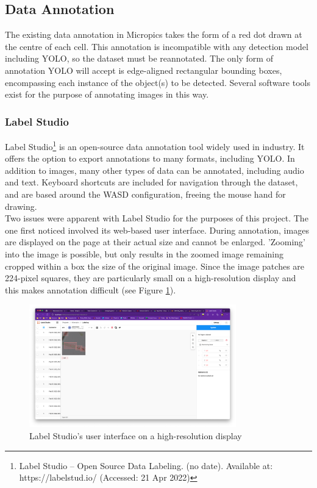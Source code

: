 \subsection{Data Annotation}
The existing data annotation in Micropics takes the form of a red dot drawn at the centre of each cell. This annotation is incompatible with any detection model including YOLO, so the dataset must be reannotated. The only form of annotation YOLO will accept is edge-aligned rectangular bounding boxes, encompassing each instance of the object(s) to be detected. Several software tools exist for the purpose of annotating images in this way.

\subsubsection{Label Studio}
Label Studio\footnote{Label Studio – Open Source Data Labeling. (no date). Available at: https://labelstud.io/ (Accessed: 21 Apr 2022)} is an open-source data annotation tool widely used in industry. It offers the option to export annotations to many formats, including YOLO. In addition to images, many other types of data can be annotated, including audio and text. Keyboard shortcuts are included for navigation through the dataset, and are based around the WASD configuration, freeing the mouse hand for drawing.\\

Two issues were apparent with Label Studio for the purposes of this project. The one first noticed involved its web-based user interface. During annotation, images are displayed on the page at their actual size and cannot be enlarged. 'Zooming' into the image is possible, but only results in the zoomed image remaining cropped within a box the size of the original image. Since the image patches are 224-pixel squares, they are particularly small on a high-resolution display and this makes annotation difficult (see Figure \ref{label-studio-large}).\\

\begin{figure}[h!]
	\centering
	\includegraphics[width=0.8\textwidth]{images/03Design/label-studio-large.png}
	\caption{Label Studio's user interface on a high-resolution display}
    \label{label-studio-large}
\end{figure}

